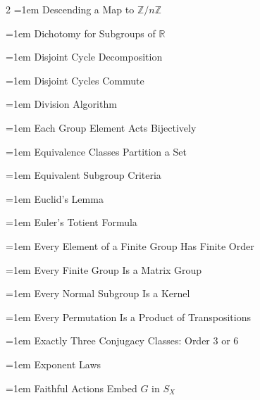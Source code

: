 \documentclass[11pt]{report}
\begin{document}
\begin{multicols}{2}
\noindent\hangindent=1em Descending a Map to $\mathbb{Z}/n\mathbb{Z}$\dotfill \pageref{lem:descending-map-z-nz}\par
\noindent\hangindent=1em Dichotomy for Subgroups of $\mathbb{R}$\dotfill \pageref{prop:dichotomy-subgroups-r}\par
\noindent\hangindent=1em Disjoint Cycle Decomposition\dotfill \pageref{thm:disjoint-cycle-decomposition}\par
\noindent\hangindent=1em Disjoint Cycles Commute\dotfill \pageref{lem:disjoint-cycles-commute}\par
\noindent\hangindent=1em Division Algorithm\dotfill \pageref{lem:division-algorithm}\par
\noindent\hangindent=1em Each Group Element Acts Bijectively\dotfill \pageref{prop:each-group-element-acts-bijectively}\par
\noindent\hangindent=1em Equivalence Classes Partition a Set\dotfill \pageref{prop:equivalence-classes-partition-set}\par
\noindent\hangindent=1em Equivalent Subgroup Criteria\dotfill \pageref{prop:equivalent-subgroup-criteria}\par
\noindent\hangindent=1em Euclid's Lemma\dotfill \pageref{lem:euclids-lemma}\par
\noindent\hangindent=1em Euler's Totient Formula\dotfill \pageref{cor:eulers-totient-formula}\par
\noindent\hangindent=1em Every Element of a Finite Group Has Finite Order\dotfill \pageref{prop:every-element-finite-group-has-finite-order}\par
\noindent\hangindent=1em Every Finite Group Is a Matrix Group\dotfill \pageref{cor:every-finite-group-matrix-group}\par
\noindent\hangindent=1em Every Normal Subgroup Is a Kernel\dotfill \pageref{prop:every-normal-subgroup-kernel}\par
\noindent\hangindent=1em Every Permutation Is a Product of Transpositions\dotfill \pageref{prop:every-permutation-product-transpositions}\par
\noindent\hangindent=1em Exactly Three Conjugacy Classes: Order $3$ or $6$\dotfill \pageref{cor:exactly-three-conjugacy-classes-order-3-or-6}\par
\noindent\hangindent=1em Exponent Laws\dotfill \pageref{lem:exponent-laws}\par
\noindent\hangindent=1em Faithful Actions Embed $G$ in $S_X$\dotfill \pageref{prop:faithful-actions-embed-g-sx}\par

\end{multicols}
\end{document}
